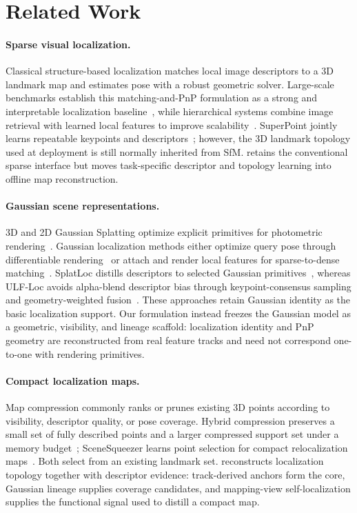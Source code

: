 \section{Related Work}

\paragraph{Sparse visual localization.}
Classical structure-based localization matches local image descriptors to a 3D
landmark map and estimates pose with a robust geometric solver. Large-scale
benchmarks establish this matching-and-PnP formulation as a strong and
interpretable localization baseline~\cite{sattler2018benchmarking}, while
hierarchical systems combine image retrieval with learned local features to
improve scalability~\cite{sarlin2019hloc}. SuperPoint jointly learns repeatable
keypoints and descriptors~\cite{detone2018superpoint}; however, the 3D landmark
topology used at deployment is still normally inherited from SfM. \method
retains the conventional sparse interface but moves task-specific descriptor
and topology learning into offline map reconstruction.

\paragraph{Gaussian scene representations.}
3D and 2D Gaussian Splatting optimize explicit primitives for photometric
rendering~\cite{kerbl2023gaussian,huang20242dgs}. Gaussian localization methods
either optimize query pose through differentiable rendering~\cite{botashev2024gsloc}
or attach and render local features for sparse-to-dense
matching~\cite{huang2025stdloc}. SplatLoc distills descriptors to selected
Gaussian primitives~\cite{zhai2024splatloc}, whereas ULF-Loc avoids alpha-blend
descriptor bias through keypoint-consensus sampling and geometry-weighted
fusion~\cite{gu2026ulfloc}. These approaches retain Gaussian identity as the
basic localization support. Our formulation instead freezes the Gaussian model
as a geometric, visibility, and lineage scaffold: localization identity and PnP
geometry are reconstructed from real feature tracks and need not correspond
one-to-one with rendering primitives.

\paragraph{Compact localization maps.}
Map compression commonly ranks or prunes existing 3D points according to
visibility, descriptor quality, or pose coverage. Hybrid compression preserves
a small set of fully described points and a larger compressed support set under
a memory budget~\cite{camposeco2019hybrid}; SceneSqueezer learns point selection
for compact relocalization maps~\cite{yang2022scenesqueezer}. Both select from an
existing landmark set. \method reconstructs localization topology together with
descriptor evidence: track-derived anchors form the core, Gaussian lineage
supplies coverage candidates, and mapping-view self-localization supplies the
functional signal used to distill a compact map.
